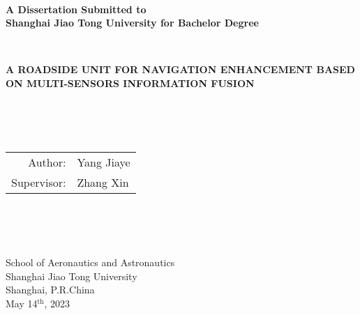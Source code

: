 \newpage
\thispagestyle{empty}
~\\
\begin{center}
\textbf{
A Dissertation Submitted to \\
Shanghai Jiao Tong University for Bachelor Degree}
\end{center}
~\\
\begin{center}
\textbf{
A ROADSIDE UNIT FOR NAVIGATION ENHANCEMENT BASED ON MULTI-SENSORS INFORMATION FUSION}
\end{center}
~\\
~\\
~\\
\begin{center}
\begin{tabular}{r@{ }l}
Author: & Yang Jiaye\\
Supervisor: & Zhang Xin
\end{tabular}
\end{center}
~\\
~\\
~\\
\begin{center}
School of Aeronautics and Astronautics \\
Shanghai Jiao Tong University \\
Shanghai, P.R.China \\
May 14$^{\mathrm{th}}$, 2023 
\end{center}